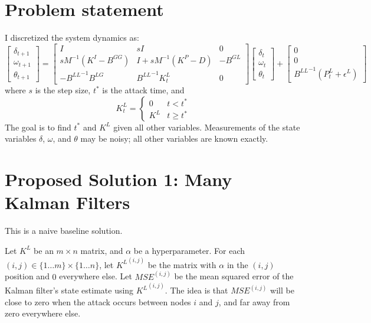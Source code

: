 \documentclass{article}
\begin{document}
\section*{Problem statement}
I discretized the system dynamics as:
\begin{equation}
\begin{bmatrix}
\delta_{t+1} \\
\omega_{t+1} \\
\theta_{t+1}
\end{bmatrix}
=
\begin{bmatrix}
I & sI & 0 \\
sM^{-1}(K^I-B^{GG}) & I + sM^{-1}(K^P-D) & -B^{GL} \\
-{B^{LL}}^{-1}B^{LG} & {B^{LL}}^{-1}K^L_t & 0
\end{bmatrix}
\begin{bmatrix}
\delta_{t} \\
\omega_{t} \\
\theta_{t}
\end{bmatrix}
+
\begin{bmatrix}
0 \\
0 \\
{B^{LL}}^{-1}(P^L_t + \epsilon^L)
\end{bmatrix}
\label{eq:sysdyn}
\end{equation}
where $s$ is the step size, $t^*$ is the attack time, and
\begin{equation}
\label{eq:K}
K^L_t =
\begin{cases}
0   & t < t^* \\
K^L & t \ge t^*
\end{cases}
\end{equation}
The goal is to find $t^*$ and $K^L$ given all other variables.
Measurements of the state variables $\delta$, $\omega$, and $\theta$ may be noisy;
all other variables are known exactly.

\section*{Proposed Solution 1: Many Kalman Filters}

This is a naive baseline solution.

Let $K^L$ be an $m\times n$ matrix, and $\alpha$ be a hyperparameter.
For each $(i,j) \in \{1\dots m\}\times\{1\dots n\}$, let
${K^L}^{(i,j)}$ be the matrix with $\alpha$ in the $(i,j)$ position and $0$ everywhere else.
Let $MSE^{(i,j)}$ be the mean squared error of the Kalman filter's state estimate using ${K^L}^{(i,j)}$.
The idea is that $MSE^{(i,j)}$ will be close to zero when the attack occurs between nodes $i$ and $j$, and far away from zero everywhere else.
\end{document}
